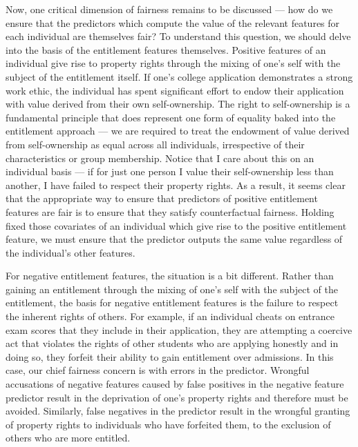 Now, one critical dimension of fairness remains to be discussed — how do we
ensure that the predictors which compute the value of the relevant features for
each individual are themselves fair? To understand this question, we should
delve into the basis of the entitlement features themselves. Positive features
of an individual give rise to property rights through the mixing of one's self 
with the subject of the entitlement itself. If one's college application
demonstrates a strong work ethic, the individual has spent significant effort to
endow their application with value derived from their own self-ownership. The
right to self-ownership is a fundamental principle that does represent one form
of equality baked into the entitlement approach — we are required to treat the 
endowment of value derived from self-ownership as equal across all individuals,
irrespective of their characteristics or group membership. Notice that I care 
about this on an individual basis — if for just one person I value their
self-ownership less than another, I have failed to respect their property 
rights. As a result, it seems clear that the appropriate way to ensure that 
predictors of positive entitlement features are fair is to ensure that they
satisfy counterfactual fairness. Holding fixed those covariates of an
individual which give rise to the positive entitlement feature, we must ensure
that the predictor outputs the same value regardless of the individual's other
features.

For negative entitlement features, the situation is a bit different. Rather than
gaining an entitlement through the mixing of one's self with the subject of the
entitlement, the basis for negative entitlement features is the failure to
respect the inherent rights of others. For example, if an individual cheats on
entrance exam scores that they include in their application, they are attempting
a coercive act that violates the rights of other students who are applying
honestly and in doing so, they forfeit their ability to gain entitlement over
admissions. In this case, our chief fairness concern is with errors in the
predictor. Wrongful accusations of negative features caused by false positives
in the negative feature predictor result in the deprivation of one's property
rights and therefore must be avoided. Similarly, false negatives in the
predictor result in the wrongful granting of property rights to individuals who
have forfeited them, to the exclusion of others who are more entitled.


